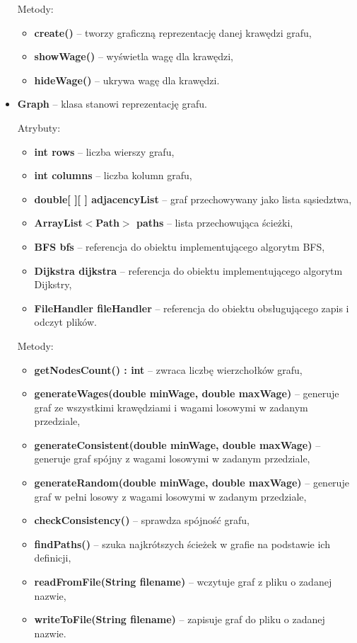 \documentclass{article}
\begin{document}
\begin{itemize}
    Metody:
    \begin{itemize}
        \item \textbf{create()} -- tworzy graficzną reprezentację danej krawędzi grafu,
        \item \textbf{showWage()} -- wyświetla wagę dla krawędzi,
        \item \textbf{hideWage()} -- ukrywa wagę dla krawędzi.
    \end{itemize}
    
\newpage
    
    \item \textbf{Graph} -- klasa stanowi reprezentację grafu.
    
    Atrybuty:
    \begin{itemize}
        \item \textbf{int rows} -- liczba wierszy grafu,
        \item \textbf{int columns} -- liczba kolumn grafu,
        \item \textbf{double[ ][ ] adjacencyList} -- graf przechowywany jako lista sąsiedztwa,
        \item \textbf{ArrayList$<$Path$>$ paths} -- lista przechowująca ścieżki,
        \item \textbf{BFS bfs} -- referencja do obiektu implementującego algorytm BFS,
        \item \textbf{Dijkstra dijkstra} -- referencja do obiektu implementującego algorytm Dijkstry,
        \item \textbf{FileHandler fileHandler} -- referencja do obiektu obsługującego zapis i odczyt plików.
    \end{itemize}
    
    Metody:
    \begin{itemize}
        \item \textbf{getNodesCount() : int} -- zwraca liczbę wierzchołków grafu,
        \item \textbf{generateWages(double minWage, double maxWage)} -- generuje graf ze wszystkimi krawędziami i wagami losowymi w zadanym przedziale,
        \item \textbf{generateConsistent(double minWage, double maxWage)} -- generuje graf spójny z wagami losowymi w zadanym przedziale,
        \item \textbf{generateRandom(double minWage, double maxWage)} -- generuje graf w pełni losowy z wagami losowymi w zadanym przedziale,
        \item \textbf{checkConsistency()} -- sprawdza spójność grafu,
        \item \textbf{findPaths()} -- szuka najkrótszych ścieżek w grafie na podstawie ich definicji,
        \item \textbf{readFromFile(String filename)} -- wczytuje graf z pliku o zadanej nazwie,
        \item \textbf{writeToFile(String filename)} -- zapisuje graf do pliku o zadanej nazwie.
    \end{itemize}
    

\end{itemize}
\end{document}
